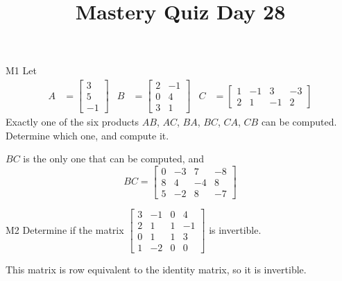\documentclass{sbgLAquiz}
\title{Mastery Quiz Day 28 }
\begin{document}
\begin{problem}{M1}
Let 
\begin{align*}
A &= \begin{bmatrix} 3 \\ 5 \\ -1  \end{bmatrix} & B &= \begin{bmatrix} 2 & -1 \\ 0 & 4 \\ 3 & 1 \end{bmatrix} & C&=\begin{bmatrix} 1 & -1 & 3 & -3 \\ 2 & 1 & -1 & 2 \end{bmatrix}
\end{align*}
Exactly one of the six products $AB$, $AC$, $BA$, $BC$, $CA$, $CB$ can be computed.  Determine which one, and compute it.
\end{problem}
\begin{solution}
$BC$ is the only one that can be computed, and
$$BC=\begin{bmatrix} 0 & -3 & 7 & -8 \\ 8 & 4 & -4 & 8 \\ 5 & -2 & 8 & -7 \end{bmatrix}$$
\end{solution}

\begin{problem}{M2}
Determine if the matrix $\begin{bmatrix} 3 & -1 & 0 & 4 \\ 2 & 1 & 1 & -1 \\ 0 & 1 & 1 & 3 \\ 1 & -2 & 0 & 0 \end{bmatrix}$ is invertible.
\end{problem}
\begin{solution}
This matrix is row equivalent to the identity matrix, so it is invertible.
\end{solution}
\end{document}
